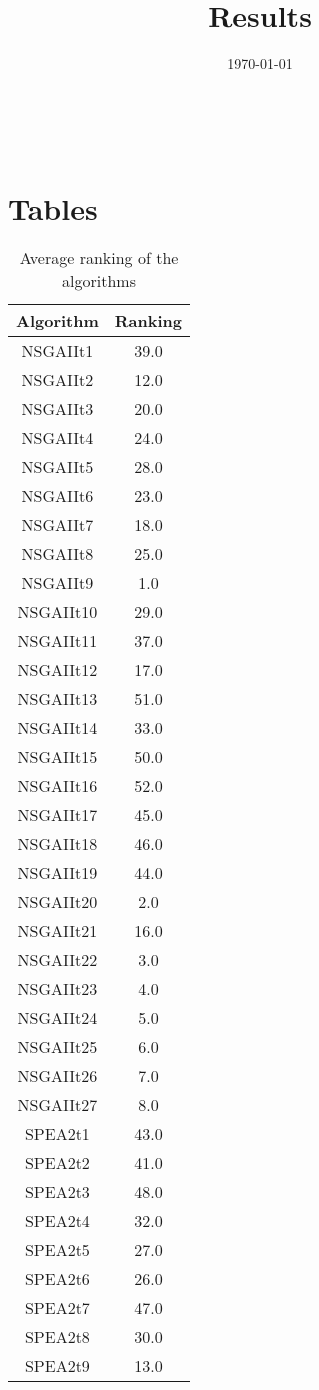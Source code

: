 \documentclass{article}
\title{Results}
\author{}
\date{\today}
\begin{document}
\oddsidemargin 0in \topmargin 0in\maketitle
\
\section{Tables}
\begin{table}[!htp]
\centering
\caption{Average ranking of the algorithms}
\begin{tabular}{c|c}
Algorithm&Ranking\\
\hline
NSGAIIt1&39.0\\
NSGAIIt2&12.0\\
NSGAIIt3&20.0\\
NSGAIIt4&24.0\\
NSGAIIt5&28.0\\
NSGAIIt6&23.0\\
NSGAIIt7&18.0\\
NSGAIIt8&25.0\\
NSGAIIt9&1.0\\
NSGAIIt10&29.0\\
NSGAIIt11&37.0\\
NSGAIIt12&17.0\\
NSGAIIt13&51.0\\
NSGAIIt14&33.0\\
NSGAIIt15&50.0\\
NSGAIIt16&52.0\\
NSGAIIt17&45.0\\
NSGAIIt18&46.0\\
NSGAIIt19&44.0\\
NSGAIIt20&2.0\\
NSGAIIt21&16.0\\
NSGAIIt22&3.0\\
NSGAIIt23&4.0\\
NSGAIIt24&5.0\\
NSGAIIt25&6.0\\
NSGAIIt26&7.0\\
NSGAIIt27&8.0\\
SPEA2t1&43.0\\
SPEA2t2&41.0\\
SPEA2t3&48.0\\
SPEA2t4&32.0\\
SPEA2t5&27.0\\
SPEA2t6&26.0\\
SPEA2t7&47.0\\
SPEA2t8&30.0\\
SPEA2t9&13.0\\

\end{tabular}
\end{table}
\end{document}
